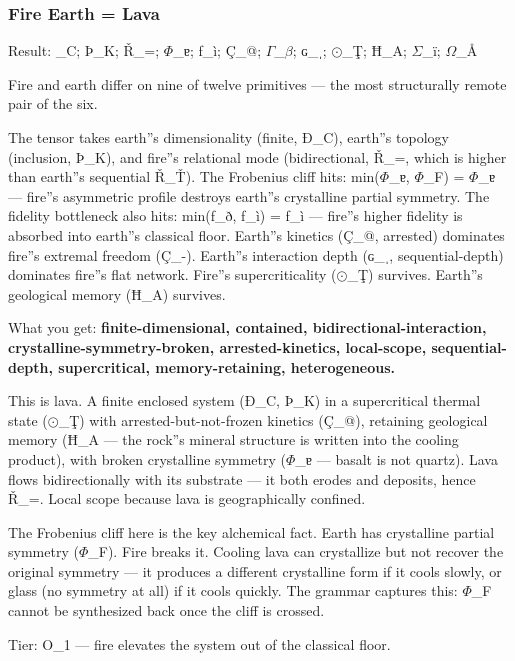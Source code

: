\documentclass[12pt,a4paper]{article}
\begin{document}
\subsubsection{Fire \otimes Earth = Lava}

Result: \_C; Þ\_K; Ř\_=; $\Phi$\_ɐ; ƒ\_ì; Ç\_@; $\Gamma$\_$\beta$; ɢ\_ˌ; $\odot$\_Ţ; Ħ\_A; $\Sigma$\_ï; $\Omega$\_Å\rangle

Fire and earth differ on nine of twelve primitives --- the most structurally remote pair of the six.

The tensor takes earth''s dimensionality (finite, Ð\_C), earth''s topology (inclusion, Þ\_K), and fire''s relational mode (bidirectional, Ř\_=, which is higher than earth''s sequential Ř\_Ť). The Frobenius cliff hits: min($\Phi$\_ɐ, $\Phi$\_F) = $\Phi$\_ɐ --- fire''s asymmetric profile destroys earth''s crystalline partial symmetry. The fidelity bottleneck also hits: min(ƒ\_ð, ƒ\_ì) = ƒ\_ì --- fire''s higher fidelity is absorbed into earth''s classical floor. Earth''s kinetics (Ç\_@, arrested) dominates fire''s extremal freedom (Ç\_-). Earth''s interaction depth (ɢ\_ˌ, sequential-depth) dominates fire''s flat network. Fire''s supercriticality ($\odot$\_Ţ) survives. Earth''s geological memory (Ħ\_A) survives.

What you get: \textbf{finite-dimensional, contained, bidirectional-interaction, crystalline-symmetry-broken, arrested-kinetics, local-scope, sequential-depth, supercritical, memory-retaining, heterogeneous.}

This is lava. A finite enclosed system (Ð\_C, Þ\_K) in a supercritical thermal state ($\odot$\_Ţ) with arrested-but-not-frozen kinetics (Ç\_@), retaining geological memory (Ħ\_A --- the rock''s mineral structure is written into the cooling product), with broken crystalline symmetry ($\Phi$\_ɐ --- basalt is not quartz). Lava flows bidirectionally with its substrate --- it both erodes and deposits, hence Ř\_=. Local scope because lava is geographically confined.

The Frobenius cliff here is the key alchemical fact. Earth has crystalline partial symmetry ($\Phi$\_F). Fire breaks it. Cooling lava can crystallize but not recover the original symmetry --- it produces a different crystalline form if it cools slowly, or glass (no symmetry at all) if it cools quickly. The grammar captures this: $\Phi$\_F cannot be synthesized back once the cliff is crossed.

Tier: O\_1 --- fire elevates the system out of the classical floor.
\end{document}
